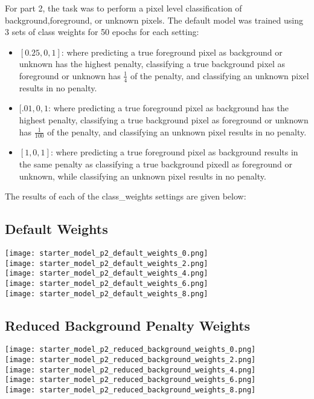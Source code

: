 \documentclass{article}
\begin{document}
For part 2, the task was to perform a pixel level classification of background,foreground, or unknown pixels. The default model was trained using 3 sets of class weights for 50 epochs for each setting:
\begin{itemize}
	\item $[0.25,0,1]$: where predicting a true foreground pixel as background or unknown has the highest penalty, classifying a true background pixel as foreground or unknown has $\frac{1}{4}$ of the penalty, and classifying an unknown pixel results in no penalty.
	\item $[.01,0,1$: where predicting a true foreground pixel as background has the highest penalty, classifying a true background pixel as foreground or unknown has $\frac{1}{100}$ of the penalty, and classifying an unknown pixel results in no penalty. 
	\item $[1,0,1]$: where predicting a true foreground pixel as background results in the same penalty as classifying a true background pixedl as foreground or unknown, while classifying an unknown pixel results in no penalty.
	\end{itemize}

	The results of each of the class\_weights settings are given below:
	\subsection*{Default Weights}
		
		
		\texttt{[image: starter\_model\_p2\_default\_weights\_0.png]} \\
		\texttt{[image: starter\_model\_p2\_default\_weights\_2.png]} \\
		\texttt{[image: starter\_model\_p2\_default\_weights\_4.png]} \\
		\texttt{[image: starter\_model\_p2\_default\_weights\_6.png]} \\
		\texttt{[image: starter\_model\_p2\_default\_weights\_8.png]} \\


	\subsection*{Reduced Background Penalty Weights}
		
		\texttt{[image: starter\_model\_p2\_reduced\_background\_weights\_0.png]} \\
		\texttt{[image: starter\_model\_p2\_reduced\_background\_weights\_2.png]} \\
		\texttt{[image: starter\_model\_p2\_reduced\_background\_weights\_4.png]} \\
		\texttt{[image: starter\_model\_p2\_reduced\_background\_weights\_6.png]} \\
		\texttt{[image: starter\_model\_p2\_reduced\_background\_weights\_8.png]} \\
\end{document}
